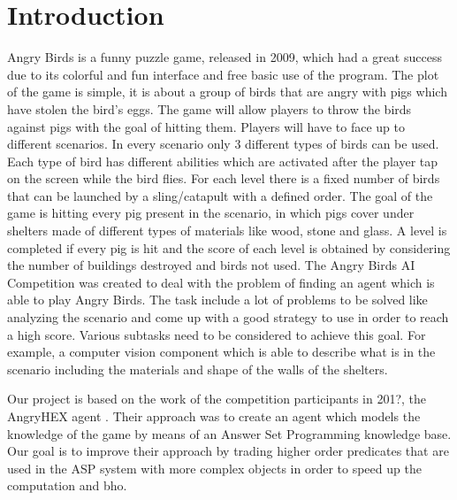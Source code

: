 \section{Introduction}
\label{sec:intro}

Angry Birds is a funny puzzle game, released in 2009, which had a great success due to its colorful and fun interface and free basic use of
the program. The plot of the game is simple, it is about a group of birds that are angry with pigs which have stolen the bird's eggs. The game will allow players to throw the birds against pigs with the goal of hitting them. Players will have to face up to different scenarios. In every scenario only 3 different types of birds can be used. Each type of bird has different abilities which are activated after the player tap on the screen while the bird flies. For each level there is a fixed number of birds that can be launched by a sling/catapult with a defined order. The goal of the game is hitting every pig present in the scenario, in which pigs cover under shelters made of different types of materials like wood, stone and glass. A level is completed if every pig is hit and the score of each level is obtained by considering the number of buildings destroyed and birds not used.
The Angry Birds AI Competition was created to deal with the problem of finding an agent which is able to play Angry Birds. The task include a lot of problems to be solved like analyzing the scenario and come up with a good strategy to use in order to reach a high score. Various subtasks need to be considered to achieve this goal. For example, a computer vision component which is able to describe what is in the scenario including the materials and shape of the walls of the shelters.

Our project is based on the work of the competition participants in 201?, the AngryHEX agent \cite{}. Their approach was to create an agent which models the knowledge of the game by means of an Answer Set Programming knowledge base.
Our goal is to improve their approach by trading higher order predicates that are used in the ASP system with more complex objects in order to speed up the computation and bho.
